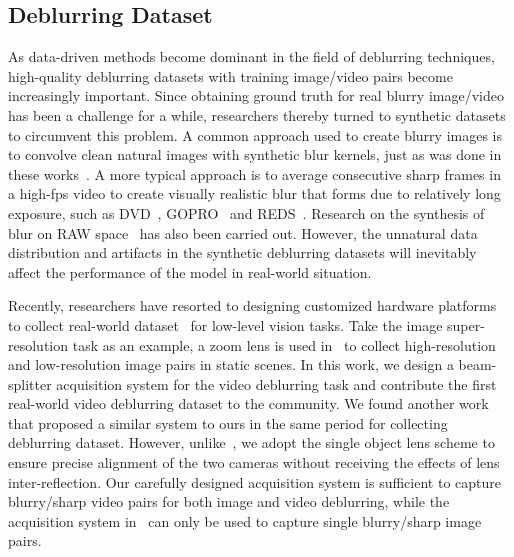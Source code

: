 \documentclass[twocolumn]{svjour3}          \smartqed  \usepackage{graphicx}
\begin{document}
\subsection{Deblurring Dataset}
\label{sec:related_dataset}
As data-driven methods become dominant in the field of deblurring techniques, high-quality deblurring datasets with training image/video pairs become increasingly important. Since obtaining ground truth for real blurry image/video has been a challenge for a while, researchers thereby turned to synthetic datasets to circumvent this problem. A common approach used to create blurry images is to convolve clean natural images with synthetic blur kernels, just as was done in these works~\cite{xu2014deep, sun2015learning, chakrabarti2016neural, kupyn2018deblurgan}. A more typical approach is to average consecutive sharp frames in a high-fps video to create visually realistic blur that forms due to relatively long exposure, such as DVD~\cite{su2017deep}, GOPRO~\cite{nah2017deep} and REDS~\cite{nah2019ntire}. Research on the synthesis of blur on RAW space~\cite{cao2022towards} has also been carried out. However, the unnatural data distribution and artifacts in the synthetic deblurring datasets will inevitably affect the performance of the model in real-world situation.

Recently, researchers have resorted to designing customized hardware platforms to collect real-world dataset~\cite{zhang2019zoom,zhong2020efficient,rim2020real,zhong2021towards,cao2022learning} for low-level vision tasks. Take the image super-resolution task as an example, a zoom lens is used in~\cite{zhang2019zoom} to collect high-resolution and low-resolution image pairs in static scenes. In this work, we design a beam-splitter acquisition system for the video deblurring task and contribute the first real-world video deblurring dataset to the community. We found another work~\cite{rim2020real} that proposed a similar system to ours in the same period for collecting deblurring dataset. However, unlike~\cite{rim2020real}, we adopt the single object lens scheme to ensure precise alignment of the two cameras without receiving the effects of lens inter-reflection. Our carefully designed acquisition system is sufficient to capture blurry/sharp video pairs for both image and video deblurring, while the acquisition system in~\cite{rim2020real} can only be used to capture single blurry/sharp image pairs.
\end{document}

